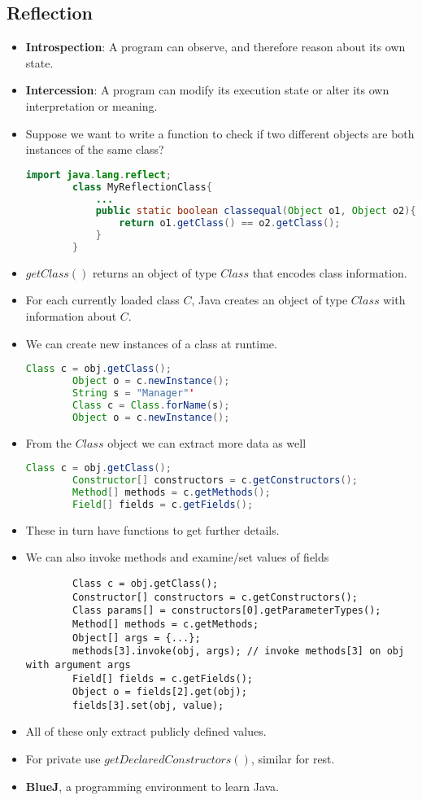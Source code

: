 \documentclass[a4paper]{article}
\begin{document}
\subsection{Reflection}
\begin{itemize}
    \item \textbf{Introspection}: A program can observe, and therefore reason about its own state.
    \item \textbf{Intercession}: A program can modify its execution state or alter its own interpretation or meaning.
    \item Suppose we want to write a function to check if two different objects are both instances of the same class?
    \begin{lstlisting}[language=Java]
        import java.lang.reflect;
        class MyReflectionClass{
            ...
            public static boolean classequal(Object o1, Object o2){
                return o1.getClass() == o2.getClass();
            }
        }
    \end{lstlisting}
    \item $getClass()$ returns an object of type $Class$ that encodes class information.
    \item For each currently loaded class $C$, Java creates an object of type $Class$ with information about $C$.
    \item We can create new instances of a class at runtime.
    \begin{lstlisting}[language=Java]
        Class c = obj.getClass();
        Object o = c.newInstance();
        String s = "Manager"'
        Class c = Class.forName(s);
        Object o = c.newInstance();
    \end{lstlisting}
    \item From the $Class$ object we can extract more data as well
    \begin{lstlisting}[language=Java]
        Class c = obj.getClass();
        Constructor[] constructors = c.getConstructors();
        Method[] methods = c.getMethods();
        Field[] fields = c.getFields();
    \end{lstlisting}
    \item These in turn have functions to get further details.
    \item We can also invoke methods and examine/set values of fields
    \begin{lstlisting}
        Class c = obj.getClass();
        Constructor[] constructors = c.getConstructors();
        Class params[] = constructors[0].getParameterTypes();
        Method[] methods = c.getMethods;
        Object[] args = {...};
        methods[3].invoke(obj, args); // invoke methods[3] on obj with argument args
        Field[] fields = c.getFields();
        Object o = fields[2].get(obj);
        fields[3].set(obj, value);
    \end{lstlisting}
    \item All of these only extract publicly defined values.
    \item For private use $getDeclaredConstructors()$, similar for rest.
    \item \textbf{BlueJ}, a programming environment to learn Java.
\end{itemize}
\end{document}
